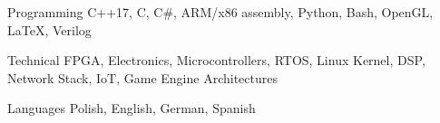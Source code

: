 

\begin{cvskills}

  \cvskill
    {Programming} %
    {C++17, C, C\#, ARM/x86 assembly, Python, Bash, OpenGL, LaTeX, Verilog} %

  \cvskill
    {Technical}
    {FPGA, Electronics, Microcontrollers, RTOS, Linux Kernel, DSP, Network Stack, IoT, Game Engine Architectures}

  \cvskill
    {Languages} %
    {Polish, English, German, Spanish} %

\end{cvskills}
